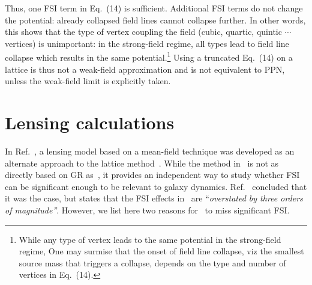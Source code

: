 \documentclass[superscriptaddress,amsmath,amssymb,nofootinbib]{revtex4}
\begin{document}
Thus, one FSI term in Eq.~(14) is sufficient. Additional FSI terms do not change the potential: already 
collapsed field lines cannot collapse further.
In other words, this shows that the type of vertex coupling the field (cubic, quartic, quintic $\cdots$ vertices)  is unimportant: in the strong-field regime,
all types lead to field line collapse which results in the same potential.\footnote{
While any type of vertex leads to the same potential in the strong-field regime, One may surmise that the onset of field line collapse, viz
the smallest source mass that triggers a collapse, depends on the type and number of vertices in Eq.~(14).} 
Using a truncated Eq.~(14)  
on a lattice is thus not a weak-field approximation and  is not equivalent to PPN, unless the weak-field limit is explicitly taken. 



\section{Lensing calculations \label{Point 2}} 
In Ref.~\cite{Deur:2020wlg}, a lensing model based on a mean-field technique was developed as an alternate approach to the lattice 
method~\cite{Deur:2009ya, Deur:2016bwq}. While the method in~\cite{Deur:2020wlg} is not as directly based on GR as~\cite{Deur:2009ya, Deur:2016bwq}, 
it provides an independent way to study whether FSI can be significant enough to be relevant to galaxy dynamics.
Ref.~\cite{Deur:2020wlg} concluded that it was the case, but \cite{Barker:2023xsx} states that the FSI effects in~\cite{Deur:2020wlg} are 
``{\it overstated by three orders of magnitude''}.  However, we list here two reasons for~\cite{Barker:2023xsx} to miss significant FSI.
\end{document}
